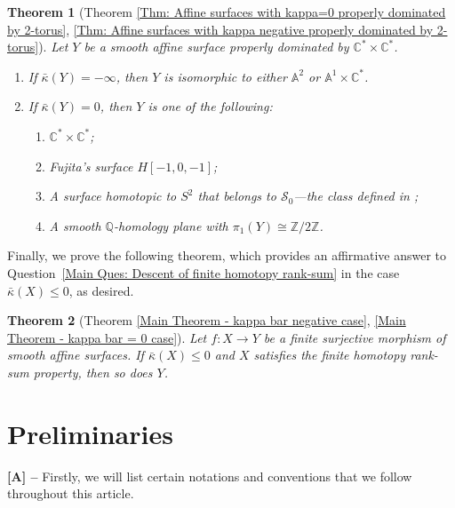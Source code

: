 \documentclass[12pt,reqno,twoside]{amsart}
\newtheorem{mainthm}{Theorem}
\theoremstyle{definition}
\numberwithin{equation}{section}
\newcommand{\A}{\mathbb{A}}
\newcommand{\C}{\mathbb{C}}
\newcommand{\Q}{\mathbb{Q}}
\newcommand{\Z}{\mathbb{Z}}
\newcommand{\Kbar}{\bar{\kappa}}
\begin{document}
\begin{mainthm}[{Theorem \ref{Thm: Affine surfaces with kappa=0 properly dominated by 2-torus}, \ref{Thm: Affine surfaces with kappa negative properly dominated by 2-torus}}]\label{thm:mainB}
Let $Y$ be a smooth affine surface properly dominated by $\C^*\times \C^*$.
\begin{enumerate}[\indent\rm(1)]
\item If $\Kbar(Y)=-\infty$, then $Y$ is isomorphic to either $\A^2$ or $\A^1\times \C^*$.

\medskip

\item If $\Kbar(Y)=0$, then $Y$ is one of the following: 

\medskip

    \begin{enumerate}[\indent]
        \item[\rm(2a)] $\C^*\times \C^*$;
        \item[\rm(2b)] Fujita’s surface $H[-1,0,-1]$;
        \item[\rm(2c)] A surface homotopic to $S^2$ that belongs to $\mathcal{S}_0$---the class defined in \cite{JSXZ2024};
        \item[\rm(2d)] A smooth $\Q$-homology plane with $\pi_1(Y)\cong \Z/2\Z$.
    \end{enumerate}
\end{enumerate}
\end{mainthm}

\medskip

Finally, we prove the following theorem, which provides an affirmative answer to Question~\ref{Main Ques: Descent of finite homotopy rank-sum} in the case $\Kbar(X)\leq 0$, as desired.

\begin{mainthm}[{Theorem \ref{Main Theorem - kappa bar negative case}, \ref{Main Theorem - kappa bar = 0 case}}]\label{thm:mainC}
Let $f \colon X \to Y$ be a finite surjective morphism of smooth affine surfaces. If $\Kbar(X)\leq0$ and $X$ satisfies the finite homotopy rank-sum property, then so does $Y$.
\end{mainthm}

\section{\bf Preliminaries}
{\bf [A] --} Firstly, we will list certain notations and conventions that we follow throughout this article.
\end{document}
